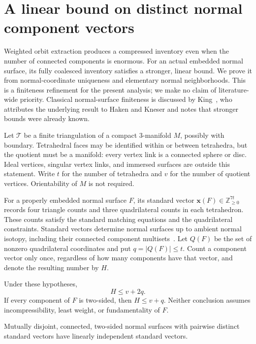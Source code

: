 \section{A linear bound on distinct normal component vectors}
\label{sec:component-profile-bound}

Weighted orbit extraction produces a compressed inventory even when the
number of connected components is enormous. For an actual embedded normal
surface, its fully coalesced inventory satisfies a stronger, linear bound.
We prove it from normal-coordinate uniqueness and elementary normal
neighborhoods. This is a finiteness refinement for the present analysis;
we make no claim of literature-wide priority. Classical normal-surface
finiteness is discussed by King~\cite[Theorem 2]{king2003}, who attributes
the underlying result to Haken and Kneser and notes that stronger bounds
were already known.

Let $\mathcal T$ be a finite triangulation of a compact $3$-manifold $M$,
possibly with boundary. Tetrahedral faces may be identified within or
between tetrahedra, but the quotient must be a manifold: every vertex
link is a connected sphere or disc. Ideal vertices, singular vertex links,
and immersed surfaces are outside this statement. Write $t$ for the
number of tetrahedra and $v$ for the number of quotient vertices.
Orientability of $M$ is not required.

For a properly embedded normal surface $F$, its standard vector
$\mathbf x(F)\in\mathbb Z_{\ge0}^{7t}$ records four triangle counts and
three quadrilateral counts in each tetrahedron. These counts satisfy the
standard matching equations and the quadrilateral constraints. Standard
vectors determine normal surfaces up to ambient normal isotopy, including
their connected component multisets~\cite[Lemma 2.5 and Theorem 2.10]{burton2009}.
Let $Q(F)$ be the set of nonzero quadrilateral coordinates and put
$q=|Q(F)|\le t$. Count a component vector only once, regardless of how
many components have that vector, and denote the resulting number by $H$.

\begin{proposition}
\label{prop:component-type-bound}
Under these hypotheses,
\[
                     H\le v+2q.
\]
If every component of $F$ is two-sided, then $H\le v+q$.
Neither conclusion assumes incompressibility, least weight, or
fundamentality of $F$.
\end{proposition}

\begin{lemma}
\label{lem:disjoint-normal-independence}
Mutually disjoint, connected, two-sided normal surfaces with pairwise
distinct standard vectors have linearly independent standard vectors.
\end{lemma}


